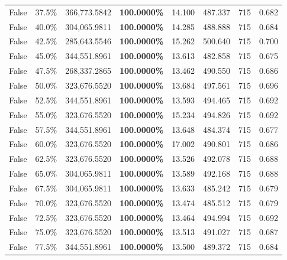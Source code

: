 \begin{table}[H]
\begin{tabular}{lllrllll}
\cline{1-8}
False & 37.5\% & 366,773.5842 & \bfseries \color{red} 100.0000\% & 14.100 & 487.337 & 715 & 0.682 \\
\cline{1-8}
False & 40.0\% & 304,065.9811 & \bfseries \color{red} 100.0000\% & 14.285 & 488.888 & 715 & 0.684 \\
\cline{1-8}
False & 42.5\% & 285,643.5546 & \bfseries \color{red} 100.0000\% & 15.262 & 500.640 & 715 & 0.700 \\
\cline{1-8}
False & 45.0\% & 344,551.8961 & \bfseries \color{red} 100.0000\% & 13.613 & 482.858 & 715 & 0.675 \\
\cline{1-8}
False & 47.5\% & \color{red} 268,337.2865 & \bfseries \color{red} 100.0000\% & 13.462 & 490.550 & 715 & 0.686 \\
\cline{1-8}
False & 50.0\% & 323,676.5520 & \bfseries \color{red} 100.0000\% & 13.684 & 497.561 & 715 & 0.696 \\
\cline{1-8}
False & 52.5\% & 344,551.8961 & \bfseries \color{red} 100.0000\% & 13.593 & 494.465 & 715 & 0.692 \\
\cline{1-8}
False & 55.0\% & 323,676.5520 & \bfseries \color{red} 100.0000\% & 15.234 & 494.826 & 715 & 0.692 \\
\cline{1-8}
False & 57.5\% & 344,551.8961 & \bfseries \color{red} 100.0000\% & 13.648 & 484.374 & 715 & 0.677 \\
\cline{1-8}
False & 60.0\% & 323,676.5520 & \bfseries \color{red} 100.0000\% & 17.002 & 490.801 & 715 & 0.686 \\
\cline{1-8}
False & 62.5\% & 323,676.5520 & \bfseries \color{red} 100.0000\% & 13.526 & 492.078 & 715 & 0.688 \\
\cline{1-8}
False & 65.0\% & 304,065.9811 & \bfseries \color{red} 100.0000\% & 13.589 & 492.168 & 715 & 0.688 \\
\cline{1-8}
False & 67.5\% & 304,065.9811 & \bfseries \color{red} 100.0000\% & 13.633 & 485.242 & 715 & 0.679 \\
\cline{1-8}
False & 70.0\% & 323,676.5520 & \bfseries \color{red} 100.0000\% & 13.474 & 485.512 & 715 & 0.679 \\
\cline{1-8}
False & 72.5\% & 323,676.5520 & \bfseries \color{red} 100.0000\% & 13.464 & 494.994 & 715 & 0.692 \\
\cline{1-8}
False & 75.0\% & 323,676.5520 & \bfseries \color{red} 100.0000\% & 13.513 & 491.027 & 715 & 0.687 \\
\cline{1-8}
False & 77.5\% & 344,551.8961 & \bfseries \color{red} 100.0000\% & 13.500 & 489.372 & 715 & 0.684 \\

\end{tabular}
\end{table}
